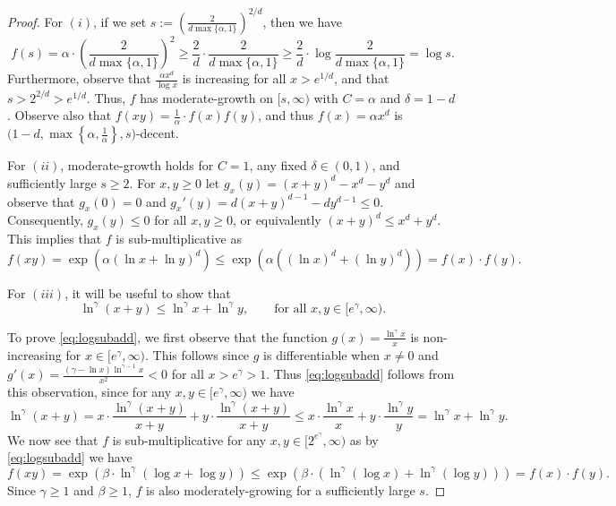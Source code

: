 \documentclass[letterpaper,11pt]{article}
\newcommand{\dec}{decent\xspace}
\newcommand{\Slin}{moderate-growth\xspace}
\newcommand{\Slinn}{moderately-growing\xspace}
\newcommand{\Smull}{sub-multiplicative\xspace}
\theoremstyle{definition}
\theoremstyle{remark}
\renewcommand{\leq}{\leqslant}
\renewcommand{\geq}{\geqslant}
\begin{document}
		\begin{proof}For $(i)$, if we set $s:= \left(\frac{2}{d\max\{\alpha, 1\}}\right)^{2/d}$, then we have \[f(s) = \alpha \cdot \left(\frac{2}{d\max\{\alpha, 1\}}\right)^{2} \geq \frac{2}{d}\cdot  \frac{2}{d\max\{\alpha, 1\}} \geq \frac{2}{d} \cdot \log \frac{2}{d\max\{\alpha, 1\}}  = \log s.  \] Furthermore, observe that $\frac{\alpha x^d}{\log x}$ is increasing for all $x> e^{1/d}$, and that $s>2^{2/d}>e^{1/d}$. Thus, $f$ has \Slin on $[s, \infty)$ with $C=\alpha$ and $\delta =1-d$. Observe also that $f(xy) = \frac{1}{\alpha}\cdot f(x)f(y)$, and thus  $f(x)=\alpha x^d $ is $\Big(1-d,\max\left\{\alpha ,\frac{1}{\alpha}\right\}, s\Big)$-\dec. 
			
			For $(ii)$, \Slin holds for $C=1$, any fixed $\delta \in(0,1)$, and sufficiently large $s\geq 2$. For $x,y\geq 0$ let $g_x(y) = (x+y)^d - x^d-y^d$ and observe that $g_x(0)=0$ and $g_x'(y) = d(x+y)^{d-1} - dy^{d-1}\leq 0 $.  Consequently, $g_x(y) \leq 0$ for all $x,y\geq 0$, or equivalently $(x+y)^d \leq x^d+y^d $. This implies that $f$ is \Smull as  
			\[f(xy) = \exp\left(\alpha (\ln x + \ln y)^d\right)\leq \exp\left(\alpha ((\ln x)^d + (\ln y)^d)\right) = f(x)\cdot f(y).\]   
			
			
			For $(iii)$,  it will be useful to show that   \begin{equation}\label{eq:logsubadd} 
				\ln^\gamma(x+y)  \leq \ln^\gamma x  + \ln^\gamma y, \qquad \text{for all }x,y \in [e^{\gamma},\infty). 
			\end{equation} 
			
			
			To prove \eqref{eq:logsubadd}, we first observe that the function $g(x)= \frac{\ln^\gamma x}{x}$ is non-increasing for $x\in [e^\gamma,\infty)$. This follows since  $g$ is differentiable when $x\neq 0$ and $g'(x) = \frac{(\gamma -\ln x )\ln^{\gamma -1 } x}{x^2} < 0 $ for all $x> e^\gamma>1$. Thus \eqref{eq:logsubadd} follows from this observation, since for any $x,y \in [e^\gamma,\infty)$ we have 
			\[\ln^\gamma(x+y) = x\cdot \frac{\ln^\gamma(x+y) }{x+y} + y\cdot \frac{\ln^\gamma(x+y) }{x+y} \leq  x\cdot \frac{\ln^\gamma x }{x} + y\cdot \frac{\ln^\gamma y}{y}= \ln^\gamma x + \ln^\gamma y. \]   
			We now see that $f$ is \Smull for any $x,y \in [2^{e^\gamma},\infty)$ as by \eqref{eq:logsubadd} we have 
			\[f(xy) =  \exp\left(\beta\cdot \ln^\gamma(\log x +\log y) \right)\leq \exp\left(\beta \cdot (\ln^\gamma(\log x)+ \ln^\gamma(\log y) ) \right)=f(x)\cdot f(y).\]   Since $\gamma \geq 1$ and $\beta\geq 1$, $f$ is also \Slinn for a sufficiently large $s$.
			

\end{proof}
\end{document}
